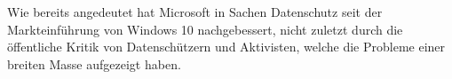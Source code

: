 

Wie bereits angedeutet hat Microsoft in Sachen Datenschutz seit der Markteinführung von Windows 10 nachgebessert, nicht zuletzt durch die öffentliche Kritik von Datenschützern und Aktivisten, welche die Probleme einer breiten Masse aufgezeigt haben.